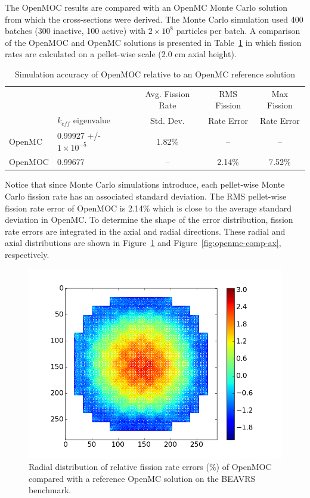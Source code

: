 \documentclass[12pt,twoside]{mitthesis-exec}
\begin{document}
The OpenMOC results are compared with an OpenMC Monte Carlo solution from which the cross-sections were derived. The Monte Carlo simulation used 400 batches (300 inactive, 100 active) with $2 \times 10^8$ particles per batch. A comparison of the OpenMOC and OpenMC solutions is presented in Table~\ref{tab:openmc-comparison} in which fission rates are calculated on a pellet-wise scale (2.0 cm axial height).

\begin{table}[ht]
	\centering
	\caption{Simulation accuracy of OpenMOC relative to an OpenMC reference solution}
	\medskip
	\begin{tabular}{l|l|c|c|c}
		&                               & Avg. Fission Rate & RMS Fission & Max Fission \\
		& $k_{\textit{eff}}$ eigenvalue & Std. Dev.         & Rate Error & Rate Error \\
		\hline
		OpenMC  & 0.99927 +/- $1 \times 10^{-5}$  & 1.82\% & --     & -- \\
		OpenMOC & 0.99677                         & --     & 2.14\% & 7.52\% \\
		\hline
	\end{tabular}
	\label{tab:openmc-comparison}
\end{table}

Notice that since Monte Carlo simulations introduce, each pellet-wise Monte Carlo fission rate has an associated standard deviation. The RMS pellet-wise fission rate error of OpenMOC is 2.14\% which is close to the average standard deviation in OpenMC. To determine the shape of the error distribution, fission rate errors are integrated in the axial and radial directions. These radial and axial distributions are shown in Figure~\ref{fig:openmc-comp-rad} and Figure~\ref{fig:openmc-comp-ax}, respectively.


\begin{figure}[ht!]
	\centering
	\includegraphics[width=0.65\linewidth]{figures/results/full-core/radial_error_v_openmc.png}
	\caption{Radial distribution of relative fission rate errors (\%) of OpenMOC compared with a reference OpenMC solution on the BEAVRS benchmark.}
	\label{fig:openmc-comp-rad}
\end{figure}
\end{document}
